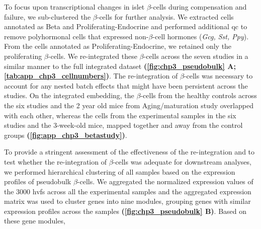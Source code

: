 \par To focus upon transcriptional changes in islet $\beta$-cells during compensation and failure, we sub-clustered the $\beta$-cells for further analysis. We extracted cells annotated as Beta and Proliferating-Endocrine and performed additional \gls{qc} to remove polyhormonal cells that  expressed non-$\beta$-cell hormones (\textit{Gcg, Sst, Ppy}). From the cells annotated as Proliferating-Endocrine, we retained only the proliferating $\beta$-cells. We re-integrated these $\beta$-cells across the seven studies in a similar manner to the full integrated dataset \textbf{(\autoref{fig:chp3_pseudobulk} A; \autoref{tab:app_chp3_cellnumbers})}. The re-integration of $\beta$-cells was necessary to account for any nested batch effects that might have been persistent across the studies. On the integrated embedding, the $\beta$-cells from the healthy controls across the six studies and the 2 year old mice from Aging/maturation study overlapped with each other, whereas the cells from the experimental samples in the six studies and the 3-week-old mice, mapped together and away from the control groups \textbf{(\autoref{fig:app_chp3_betastudy})}.\\

\par To provide a stringent assessment of the effectiveness of the re-integration and to test whether the re-integration of $\beta$-cells was adequate for downstream analyses, we performed hierarchical clustering of all samples based on the expression profiles of pseudobulk $\beta$-cells. We aggregated the normalized expression values of the 3000 \glspl{hvf} across all the experimental samples and the aggregated expression matrix was used to cluster genes into nine modules, grouping genes with similar expression profiles across the samples \textbf{(\autoref{fig:chp3_pseudobulk} B)}. Based on these gene modules, 

